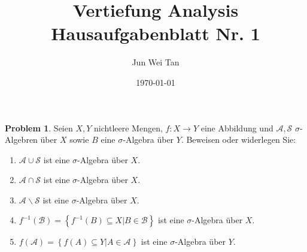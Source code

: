 \documentclass[prb,12pt]{revtex4-2}
\theoremstyle{definition}
\newtheorem{Problem}{Problem}
\theoremstyle{definition}
\newenvironment{parts}{\begin{enumerate}[label=(\alph*)]}{\end{enumerate}}
\begin{document}
	\title{Vertiefung Analysis Hausaufgabenblatt Nr. 1}
	\author{Jun Wei Tan}
	\date{\today}
	\maketitle

\begin{Problem}
	 Seien $X, Y$ nichtleere Mengen, $f : X \to Y$ eine Abbildung und $\mathcal A, \mathcal S$ $\sigma$-Algebren über $X$ sowie $B$ eine $\sigma$-Algebra über $Y$. Beweisen oder widerlegen Sie:
	 \begin{parts}
		 \item $\mathcal A \cup \mathcal S$ ist eine $\sigma$-Algebra \"{u}ber $X$.
		 \item $\mathcal A \cap \mathcal S$ ist eine $\sigma$-Algebra \"{u}ber $X$. 
		 \item $\mathcal A \backslash \mathcal S$ ist eine $\sigma$-Algebra \"{u}ber $X$.
		 \item $f ^{-1}(\mathcal B)=\left\{ f^{-1}(B)\subseteq X | B\in\mathcal B \right\}$ ist eine $\sigma$-Algebra \"{u}ber $X$.
		 \item $f(\mathcal A)=\left\{ f(A)\subseteq Y|A\in \mathcal A \right\} $ ist eine $\sigma$-Algebra \"{u}ber $Y$.
	 \end{parts}
\end{Problem}
\end{document}
